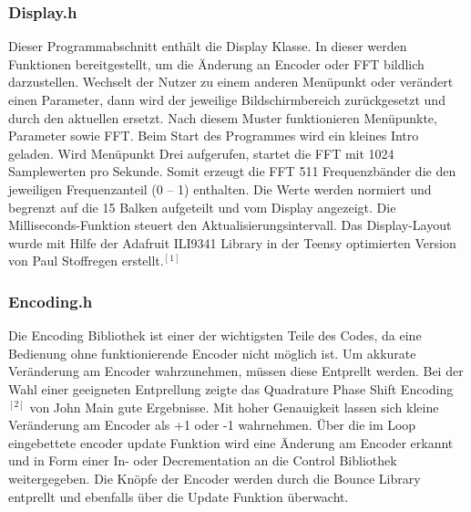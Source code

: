 \documentclass[12pt]{article}
\begin{document}
\subsubsection{Display.h}
Dieser Programmabschnitt enthält die Display Klasse. In dieser werden Funktionen bereitgestellt, um die Änderung an Encoder oder FFT bildlich darzustellen.  
Wechselt der Nutzer zu einem anderen Menüpunkt oder verändert einen Parameter, dann wird der jeweilige Bildschirmbereich zurückgesetzt und durch den aktuellen ersetzt. 
Nach diesem Muster funktionieren Menüpunkte, Parameter sowie FFT. Beim Start des Programmes wird ein kleines Intro geladen.
Wird Menüpunkt Drei aufgerufen, startet die FFT mit 1024 Samplewerten pro Sekunde. Somit erzeugt die FFT 511 Frequenzbänder die den jeweiligen Frequenzanteil (0 – 1) enthalten. 
Die Werte werden normiert und begrenzt auf die 15 Balken aufgeteilt und vom Display angezeigt. 
Die Milliseconds-Funktion steuert den Aktualisierungsintervall.  
Das Display-Layout wurde mit Hilfe der Adafruit ILI9341 Library in der Teensy optimierten Version von Paul Stoffregen erstellt.$^{[1]}$
\subsubsection{Encoding.h}
Die Encoding Bibliothek ist einer der wichtigsten Teile des Codes, da eine Bedienung ohne funktionierende Encoder nicht möglich ist. Um akkurate Veränderung am Encoder wahrzunehmen, 
müssen diese Entprellt werden. Bei der Wahl einer geeigneten Entprellung zeigte das Quadrature Phase Shift Encoding$^{[2]}$ von John Main gute Ergebnisse. Mit hoher Genauigkeit lassen sich 
kleine Veränderung am Encoder als +1 oder -1 wahrnehmen. Über die im Loop eingebettete encoder update Funktion wird eine Änderung am Encoder erkannt und in Form einer In- oder Decrementation an die Control 
Bibliothek weitergegeben. Die Knöpfe der Encoder werden durch die Bounce Library entprellt und ebenfalls über die Update Funktion überwacht.   
\newpage
\end{document}

